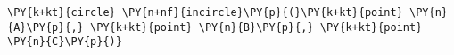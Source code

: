 \begin{Verbatim}[commandchars=\\\{\}]
    \PY{k+kt}{circle} \PY{n+nf}{incircle}\PY{p}{(}\PY{k+kt}{point} \PY{n}{A}\PY{p}{,} \PY{k+kt}{point} \PY{n}{B}\PY{p}{,} \PY{k+kt}{point} \PY{n}{C}\PY{p}{)}
\end{Verbatim}
